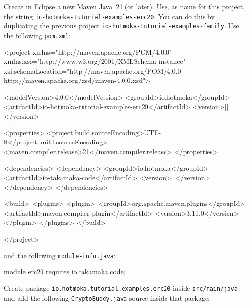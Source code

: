 Create in Eclipse a new Maven Java~21 (or later). Use, as name for this project, the string
\texttt{io-hotmoka-tutorial-examples-erc20}.
You can do this by duplicating the previous project \texttt{io-hotmoka-tutorial-examples-family}.
Use the following \texttt{pom.xml}:
%
\begin{codebox}\begin{xmllst}
<project xmlns="http://maven.apache.org/POM/4.0.0"
    xmlns:xsi="http://www.w3.org/2001/XMLSchema-instance"
    xsi:schemaLocation="http://maven.apache.org/POM/4.0.0 http://maven.apache.org/xsd/maven-4.0.0.xsd">

  <modelVersion>4.0.0</modelVersion>
  <groupId>io.hotmoka</groupId>
  <artifactId>io-hotmoka-tutorial-examples-erc20</artifactId>
  <version>|\hotmokaVersion{}|</version>

  <properties>
    <project.build.sourceEncoding>UTF-8</project.build.sourceEncoding>
    <maven.compiler.release>21</maven.compiler.release>
  </properties>

  <dependencies>
    <dependency>
      <groupId>io.hotmoka</groupId>
      <artifactId>io-takamaka-code</artifactId>
      <version>|\takamakaVersion{}|</version>
    </dependency>
  </dependencies>

  <build>
    <plugins>
      <plugin>
        <groupId>org.apache.maven.plugins</groupId>
        <artifactId>maven-compiler-plugin</artifactId>
        <version>3.11.0</version>
      </plugin>
    </plugins>
  </build>

</project>
\end{xmllst}\end{codebox}
%
and the following \texttt{module-info.java}:
%
\begin{codebox}\begin{javalst}
module erc20 {
  requires io.takamaka.code;
}
\end{javalst}\end{codebox}
%
Create package \texttt{io.hotmoka.tutorial.examples.erc20}
inside \texttt{src/main/java} and add
the following \texttt{CryptoBuddy.java} source inside that package:
%
